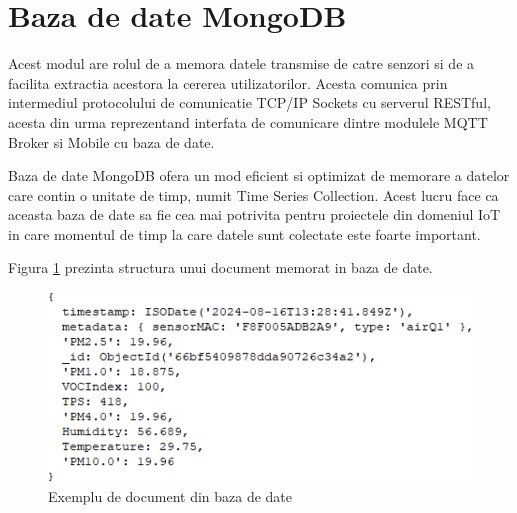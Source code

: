 \section{Baza de date MongoDB}\label{sec:pi_bazadedate}
Acest modul are rolul de a memora datele transmise de catre senzori si de a facilita extractia acestora la cererea utilizatorilor. Acesta comunica prin intermediul 
protocolului de comunicatie TCP/IP Sockets cu serverul RESTful, acesta din urma reprezentand interfata de comunicare dintre modulele MQTT Broker si Mobile cu baza 
de date. 

Baza de date MongoDB ofera un mod eficient si optimizat de memorare a datelor care contin o unitate de timp, numit Time Series Collection. Acest lucru face ca aceasta 
baza de date sa fie cea mai potrivita pentru proiectele din domeniul IoT in care momentul de timp la care datele sunt colectate este foarte important.

Figura \ref{fig:PI_MongodbDocExample} prezinta structura unui document memorat in baza de date. 
\begin{figure}[H]
    \centering
    \includegraphics[scale=0.8]{figs/PI_MongodbDocExample.png}
    \caption{Exemplu de document din baza de date}
    \label{fig:PI_MongodbDocExample}
\end{figure}

